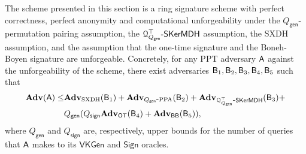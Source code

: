 \begin{theorem}\label{theo:security}
The scheme presented in this section is a ring signature scheme
with perfect correctness, perfect anonymity and computational unforgeability under the
$Q_\mathsf{gen}$-permutation pairing assumption, the $\mathcal{Q}_{Q_\mathsf{gen}}^\top\mbox{-}\mathsf{SKerMDH}$ assumption, the $\mathrm{SXDH}$ assumption, and the assumption
that the one-time signature and the Boneh-Boyen signature are unforgeable.
Concretely, for any PPT adversary $\mathsf{A}$ against the unforgeability of the scheme, there exist adversaries $\mathsf{B}_1,\mathsf{B}_2,\mathsf{B}_3,\mathsf{B}_4,\mathsf{B}_5$ such that
\begin{align*}
\mathbf{Adv}(\mathsf{A})\leq &\mathbf{Adv}_{\mathrm{SXDH}}(\mathsf{B}_1)+\mathbf{Adv}_{Q_\mathsf{gen}\mbox{-}\mathrm{PPA}}(\mathsf{B}_2)+\mathbf{Adv}_{\mathcal{Q}^\top_{Q_\mathsf{gen}}\mbox{-}\mathsf{SKerMDH}}(\mathsf{B}_3)+\\
&Q_\mathsf{gen}(Q_\mathsf{sign}\mathbf{Adv}_{\mathsf{OT}}(\mathsf{B}_4)+\mathbf{Adv}_{\mathsf{BB}}(\mathsf{B}_5)),
\end{align*}
where $Q_\mathsf{gen}$ and $Q_\mathsf{sign}$ are, respectively, upper bounds for the number of queries that $\mathsf{A}$ makes to its $\mathsf{VKGen}$ and $\mathsf{Sign}$ oracles.
\end{theorem}